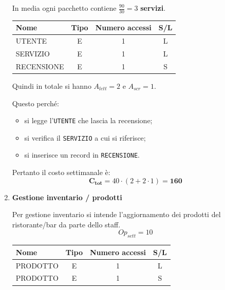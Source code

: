 \documentclass[a4paper,12pt]{report}
\begin{document}
\begin{enumerate}
    In media ogni pacchetto contiene $\frac{90}{30}=3$ \textbf{servizi}.

    \begin{table}[H]
    \centering
    \small
    \renewcommand{\arraystretch}{1.15}
    \begin{tabularx}{0.8\textwidth}{|X|c|c|c|}
        \hline
        \rowcolor{gray!20}
        \textbf{Nome} & \textbf{Tipo} & \textbf{Numero accessi} & \textbf{S/L} \\
        \hline
        UTENTE & E & 1 & L \\
        SERVIZIO & E & 1 & L \\
        RECENSIONE & E & 1 & S \\
        \hline
    \end{tabularx}
    \end{table}

    Quindi in totale si hanno $A_{lett}=2$ e $A_{scr}=1$.

    Questo perché:
    \begin{itemize}
        \item si legge l’\texttt{UTENTE} che lascia la recensione;
        \item si verifica il \texttt{SERVIZIO} a cui si riferisce;
        \item si inserisce un record in \texttt{RECENSIONE}.
    \end{itemize}

    Pertanto il costo settimanale è:
    $$\mathbf{C_{tot}} = 40 \cdot (2 + 2 \cdot 1) = \mathbf{160}$$
    

	\item {\large \textbf{Gestione inventario / prodotti}} \label{op8}
	
	Per gestione inventario si intende l'aggiornamento dei prodotti del ristorante/bar da parte dello staff.
    $$
    {Op}_{sett} = 10
    $$

    \begin{table}[H]
    \centering
    \small
    \renewcommand{\arraystretch}{1.15}
    \begin{tabularx}{0.8\textwidth}{|X|c|c|c|}
        \hline
        \rowcolor{gray!20}
        \textbf{Nome} & \textbf{Tipo} & \textbf{Numero accessi} & \textbf{S/L} \\
        \hline
        PRODOTTO & E & 1 & L \\
        PRODOTTO & E & 1 & S \\
        \hline
    \end{tabularx}
    \end{table}


\end{enumerate}
\end{document}
